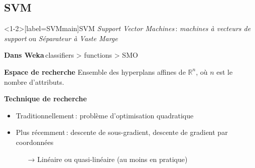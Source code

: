 \documentclass[hyperref={unicode}, xcolor={svgnames}, french]{beamer}
\begin{document}
\subsection{SVM}

\begin{frame}<1-2>[label=SVMmain]{SVM}
    \emph{Support Vector Machines} : \emph{machines à vecteurs de support} ou \emph{Séparateur à Vaste Marge}

    \textbf{Dans Weka} classifiers > functions > SMO
    \pause

    \textbf{Espace de recherche} Ensemble des hyperplans affines de $ℝ^n$, où $n$ est le nombre d'attributs.
    \pause

    \textbf{Technique de recherche}
    \begin{itemize}
        \item Traditionnellement : problème d'optimisation quadratique
        \item Plus récemment : descente de sous-gradient, descente de gradient par coordonnées
        \begin{itemize}
            \item[→] Linéaire ou quasi-linéaire (au moins en pratique)
        \end{itemize}
    \end{itemize}
\end{frame}
\end{document}

